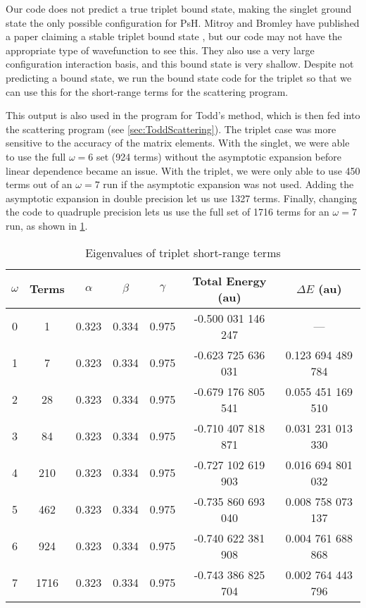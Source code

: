 \documentclass[Dissertation.tex]{subfiles}
\begin{document}
Our code does not predict a true triplet bound state, making the singlet ground state the only possible configuration for PsH. Mitroy and Bromley have published a paper claiming a stable triplet bound state \cite{Mitroy2007}, but our code may not have the appropriate type of wavefunction to see this. They also use a very large configuration interaction basis, and this bound state is very shallow. Despite not predicting a bound state, we run the bound state code for the triplet so that we can use this for the short-range terms for the scattering program.

This output is also used in the program for Todd's method, which is then fed into the scattering program (see \cref{sec:ToddScattering}). The triplet case was more sensitive to the accuracy of the matrix elements. With the singlet, we were able to use the full $\omega = 6$ set (924 terms) without the asymptotic expansion before linear dependence became an issue. With the triplet, we were only able to use 450 terms out of an $\omega = 7$ run if the asymptotic expansion was not used. Adding the asymptotic expansion in double precision let us use 1327 terms. Finally, changing the code to quadruple precision lets us use the full set of 1716 terms for an $\omega = 7$ run, as shown in \cref{tab:BoundEnergy3}. 

\setlength{\abovecaptionskip}{6pt}   %
\setlength{\belowcaptionskip}{6pt}   %
\begin{table}[H]
\centering
\begin{tabular}{c c c c c c c}
\toprule
$\omega$ & Terms & $\alpha$ & $\beta$ & $\gamma$ & Total Energy (au) & $\Delta E$ (au) \\ [0.5ex]
\midrule
0 & 1    & 0.323 & 0.334 & 0.975 & -0.500 031 146 247 & --- \\
1 & 7    & 0.323 & 0.334 & 0.975 & -0.623 725 636 031 & 0.123 694 489 784 \\
2 & 28   & 0.323 & 0.334 & 0.975 & -0.679 176 805 541 & 0.055 451 169 510 \\
3 & 84   & 0.323 & 0.334 & 0.975 & -0.710 407 818 871 & 0.031 231 013 330 \\
4 & 210  & 0.323 & 0.334 & 0.975 & -0.727 102 619 903 & 0.016 694 801 032 \\
5 & 462  & 0.323 & 0.334 & 0.975 & -0.735 860 693 040 & 0.008 758 073 137 \\
6 & 924  & 0.323 & 0.334 & 0.975 & -0.740 622 381 908 & 0.004 761 688 868 \\
7 & 1716 & 0.323 & 0.334 & 0.975 & -0.743 386 825 704 & 0.002 764 443 796 \\
\bottomrule
\end{tabular}
\caption{Eigenvalues of triplet short-range terms}
\label{tab:BoundEnergy3}
\end{table}
\end{document}
